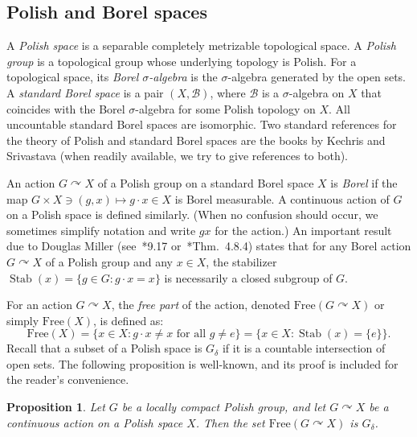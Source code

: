 \documentclass[12pt]{paper}
\numberwithin{equation}{section}
\theoremstyle{plain}
\newtheorem{proposition}[theorem]{Proposition}
\theoremstyle{definition}
\newcommand{\borel}{\mathcal{B}}
\DeclareMathOperator{\stab}{\mathrm{Stab}}
\newcommand{\acts}{\curvearrowright}
\newcommand{\free}{\mathrm{Free}}
\begin{document}
\subsection{Polish and Borel spaces}
\label{sec:polish-borel-spaces}

A \emph{Polish space} is a separable completely metrizable topological space. A \emph{Polish group}
is a topological group whose underlying topology is Polish.  For a topological space, its
\emph{Borel \(\sigma\)-algebra} is the \(\sigma\)-algebra generated by the open sets. A
\emph{standard Borel space} is a pair \((X, \borel)\), where \(\borel\) is a \(\sigma\)-algebra on
\(X\) that coincides with the Borel \(\sigma\)-algebra for some Polish topology on \(X\).  All
uncountable standard Borel spaces are isomorphic. Two standard references for the theory of Polish
and standard Borel spaces are the books by Kechris \cites{Kechris} and Srivastava \cite{MR1619545}
(when readily available, we try to give references to both).

An action \(G \acts X\) of a Polish group on a standard Borel space \(X\) is \emph{Borel} if the map
\(G \times X \ni (g,x) \mapsto g\cdot x \in X\)
is Borel measurable.  A continuous action of \(G\)
on a Polish space is defined similarly.  (When no confusion should occur, we sometimes simplify
notation and write \(g x\) for the action.)  An important result due to Douglas Miller
(see~\cite{Kechris}*{9.17} or~\cite{MR1619545}*{Thm.~4.8.4}) states that for any Borel action
\(G \acts X\) of a Polish group and any \(x \in X\), the stabilizer
\(\stab(x) = \{g \in G : g\cdot x = x\}\) is necessarily a closed subgroup of \(G\).

For an action \(G \acts X\), the \emph{free part} of the action, denoted \(\free(G \acts X)\) or
simply \(\free(X)\), is defined as:
\[\free(X) = \{x \in X : g\cdot x \ne x \textrm{ for all } g \ne e\}
  = \{x \in X : \stab(x) = \{e\}\}.\]
Recall that a subset of a Polish space is \(G_{\delta}\) if it is a countable intersection of open
sets.  The following proposition is well-known, and its proof is included for the reader's
convenience.

\begin{proposition}
  \label{prop:free-part-g-delta}
  Let \(G\) be a locally compact Polish group, and let \(G \acts X\) be a continuous action on a
  Polish space \(X\).  Then the set \(\free(G \acts X)\) is \(G_{\delta}\).
\end{proposition}
\end{document}
